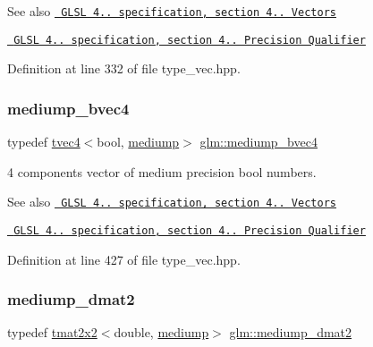 \begin{DoxySeeAlso}{See also}
\href{http://www.opengl.org/registry/doc/GLSLangSpec.4.20.8.pdf}{\texttt{ G\+L\+SL 4.. specification, section 4.. Vectors}} 

\href{http://www.opengl.org/registry/doc/GLSLangSpec.4.20.8.pdf}{\texttt{ G\+L\+SL 4.. specification, section 4.. Precision Qualifier}} 
\end{DoxySeeAlso}


Definition at line 332 of file type\+\_\+vec.\+hpp.

\mbox{\label{group__core__precision_ga92b3f3ba6ecceaea364906ad7ee985a5}} 
\subsubsection{\texorpdfstring{mediump\_bvec4}{mediump\_bvec4}}
{\footnotesize\ttfamily typedef \mbox{\hyperlink{structglm_1_1tvec4}{tvec4}}$<$bool, \mbox{\hyperlink{namespaceglm_a0f04f086094c747d227af4425893f545a6416f3ea0c9025fb21ed50c4d6620482}{mediump}}$>$ \mbox{\hyperlink{group__core__precision_ga92b3f3ba6ecceaea364906ad7ee985a5}{glm\+::mediump\+\_\+bvec4}}}

4 components vector of medium precision bool numbers.

\begin{DoxySeeAlso}{See also}
\href{http://www.opengl.org/registry/doc/GLSLangSpec.4.20.8.pdf}{\texttt{ G\+L\+SL 4.. specification, section 4.. Vectors}} 

\href{http://www.opengl.org/registry/doc/GLSLangSpec.4.20.8.pdf}{\texttt{ G\+L\+SL 4.. specification, section 4.. Precision Qualifier}} 
\end{DoxySeeAlso}


Definition at line 427 of file type\+\_\+vec.\+hpp.

\mbox{\label{group__core__precision_ga15d28c9d2c24b698597e9ad9e083520d}} 
\subsubsection{\texorpdfstring{mediump\_dmat2}{mediump\_dmat2}}
{\footnotesize\ttfamily typedef \mbox{\hyperlink{structglm_1_1tmat2x2}{tmat2x2}}$<$double, \mbox{\hyperlink{namespaceglm_a0f04f086094c747d227af4425893f545a6416f3ea0c9025fb21ed50c4d6620482}{mediump}}$>$ \mbox{\hyperlink{group__core__precision_ga15d28c9d2c24b698597e9ad9e083520d}{glm\+::mediump\+\_\+dmat2}}}

